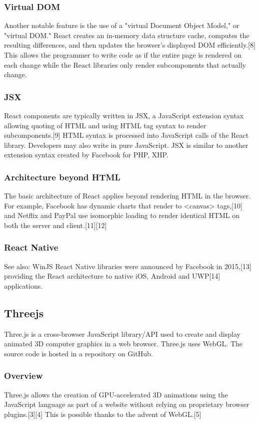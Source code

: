 \subsubsection{Virtual DOM}
Another notable feature is the use of a "virtual Document Object Model," or "virtual DOM." React creates an in-memory data structure cache, computes the resulting differences, and then updates the browser's displayed DOM efficiently.[8] This allows the programmer to write code as if the entire page is rendered on each change while the React libraries only render subcomponents that actually change.

\subsubsection{JSX}
React components are typically written in JSX, a JavaScript extension syntax allowing quoting of HTML and using HTML tag syntax to render subcomponents.[9] HTML syntax is processed into JavaScript calls of the React library. Developers may also write in pure JavaScript. JSX is similar to another extension syntax created by Facebook for PHP, XHP.

\subsubsection{Architecture beyond HTML}
The basic architecture of React applies beyond rendering HTML in the browser. For example, Facebook has dynamic charts that render to <canvas> tags,[10] and Netflix and PayPal use isomorphic loading to render identical HTML on both the server and client.[11][12]

\subsubsection{React Native}
See also: WinJS
React Native libraries were announced by Facebook in 2015,[13] providing the React architecture to native iOS, Android and UWP[14] applications.

\newpage
\subsection{Threejs}
Three.js is a cross-browser JavaScript library/API used to create and display animated 3D computer graphics in a web browser. Three.js uses WebGL. The source code is hosted in a repository on GitHub.

\subsubsection{Overview}
Three.js allows the creation of GPU-accelerated 3D animations using the JavaScript language as part of a website without relying on proprietary browser plugins.[3][4] This is possible thanks to the advent of WebGL.[5]

